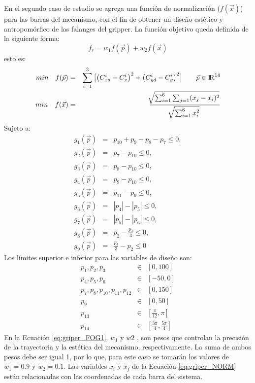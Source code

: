 En el segundo caso de estudio se agrega una función de normalización ($f(\vec{x})$) para las barras del mecanismo, con el fin de obtener un diseño  estético y antropomórfico de las falanges del gripper. La función objetivo queda definida de la siguiente forma:
\begin{equation}\label{eq:griper_FOG1}
  f_r= w_1f(\vec{p})+w_2f(\vec{x})
\end{equation}
esto es:
 \begin{eqnarray}\label{}
min\quad  f(\vec{p})&=&
\sum_{i=1}^{3}\big[\big(C^{i}_{xd}-C^{i}_{x} \big)^2 +\big(C^{i}_{yd}-C^{i}_{y} \big)^2\big] \qquad \vec{p} \in  {\rm I\!R}^{14} \\
min\quad  f(\vec{x})&=&\frac{\sqrt[]{\sum^6_{i=1}\sum_{j=1}(x_j-x_i)^2}}{\sqrt[]{\sum^6_{i=1}x^2_i}} \label{eq:griper_NORM}
\end{eqnarray}
Sujeto a:
\begin{eqnarray}\label{eq:Restricciones griper2}
g_{1}(\vec{p})&=&p_{10}+ p_{9}-p_{8}-p_{7} \leq 0,\\
g_{2}(\vec{p})&=&p_{7}-p_{10} \leq 0,\\
g_{3}(\vec{p})&=&p_{8}-p_{10} \leq 0,\\
g_{4}(\vec{p})&=&p_{9}-p_{10} \leq 0,\\
g_{5}(\vec{p})&=&p_{11}-p_{9} \leq 0,\\
g_{6}(\vec{p})&=&|p_{4}|-|p_{5}| \leq 0,\\
g_{7}(\vec{p})&=&|p_{5}|-|p_{6}| \leq 0,\\
g_{8}(\vec{p})&=&p_{2}-\frac{p_3}{3} \leq 0,\\
g_{9}(\vec{p})&=&\frac{p_3}{3}-p_{2} \leq 0
\end{eqnarray}
Los límites superior e inferior para las variables de diseño son:
\begin{eqnarray}\label{eq:limites variables griper2}
p_1,p_2,p_3 & \in & \left[ 0,100\right] \\
p_4,p_5,p_6 & \in & \left[ -50,0\right] \\
p_7,p_8,p_{10},p_{11},p_{12} & \in & \left[ 0,150 \right] \\
p_9 & \in & \left[ 0,50\right] \\
p_{13} & \in & \left[ \frac{\pi}{12},\pi \right] \\
p_{14} & \in & \left[ \frac{3\pi}{4},\frac{5\pi}{4} \right]
\end{eqnarray}
En la Ecuación \ref{eq:griper_FOG1}, $w_1$ y $w2$ , son pesos que controlan la precisión de la trayectoria y la estética del mecanismo, respectivamente. La suma de ambos pesos debe ser igual 1, por lo que, para este caso se tomarán los valores de $w_1=0.9$ y $w_2=0.1$. Las variables $x_i$ y $x_j$ de la Ecuación \ref{eq:griper_NORM} están relacionadas con las coordenadas de cada barra del sistema.

